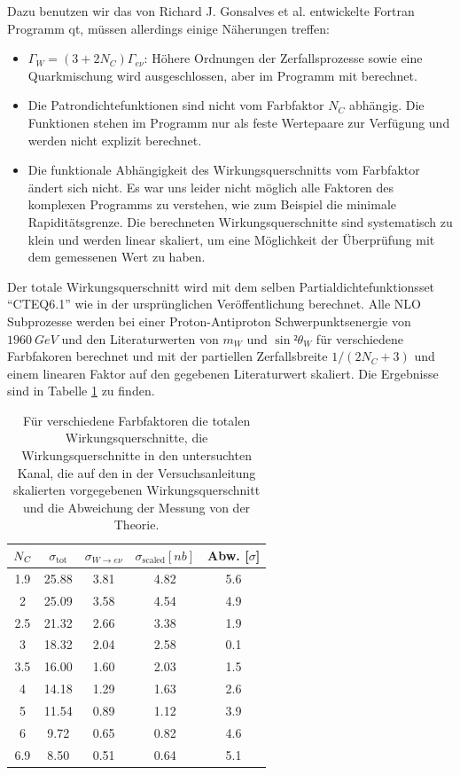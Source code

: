 \documentclass[a4paper,12pt]{article}
\begin{document}
Dazu benutzen wir das von Richard J. Gonsalves et al. entwickelte Fortran Programm qt\cite{qtsite},
müssen allerdings einige Näherungen treffen:
\begin{itemize}
	\item $Γ_W = (3+2N_C)Γ_{eν}$: Höhere Ordnungen der Zerfallsprozesse sowie eine Quarkmischung
		wird ausgeschlossen, aber im Programm mit berechnet.
	\item Die Patrondichtefunktionen sind nicht vom Farbfaktor $N_C$ abhängig. Die Funktionen stehen
		im Programm nur als feste Wertepaare zur Verfügung und werden nicht explizit berechnet.
	\item Die funktionale Abhängigkeit des Wirkungsquerschnitts vom Farbfaktor ändert sich nicht. Es
		war uns leider nicht möglich alle Faktoren des komplexen Programms zu verstehen, wie zum
		Beispiel die minimale Rapiditätsgrenze. Die berechneten Wirkungsquerschnitte sind
		systematisch zu klein und werden linear skaliert, um eine Möglichkeit der Überprüfung mit dem gemessenen
		Wert zu haben.
\end{itemize}

Der totale Wirkungsquerschnitt wird mit dem selben Partialdichtefunktionsset "`CTEQ6.1"' wie in der ursprünglichen
Veröffentlichung\cite{Abachi:1996ey} berechnet. Alle NLO Subprozesse werden bei einer
Proton-Antiproton Schwerpunktsenergie von $\SI{1960}{GeV}$ und den Literaturwerten von $m_W$ und
$\sin²θ_W$ für verschiedene Farbfakoren berechnet
und mit der partiellen Zerfallsbreite $1/(2N_C +3)$ und einem linearen Faktor auf den gegebenen Literaturwert skaliert.
Die Ergebnisse sind in Tabelle \ref{tab:color} zu finden.

\begin{table}[h]
	\centering
	\begin{tabular}{c| c c c|c}
		$N_{\textsl{C}}$ & $\sigma_\text{tot}$ &$σ_{W\rightarrow eν}$ & $σ_\text{scaled}[\si{nb}]$
		& Abw. [$σ$] \\
		\hline
1.9 & 25.88 & 3.81 & 4.82 & 5.6 \\
2 & 25.09 & 3.58 & 4.54 & 4.9 \\
2.5 & 21.32 & 2.66 & 3.38 & 1.9 \\
\hline
3 & 18.32 & 2.04 & 2.58 & 0.1 \\
\hline
3.5 & 16.00 & 1.60 & 2.03 & 1.5 \\
4 & 14.18 & 1.29 & 1.63 & 2.6 \\
5 & 11.54 & 0.89 & 1.12 & 3.9 \\
6 & 9.72 & 0.65 & 0.82 & 4.6 \\
6.9 & 8.50 & 0.51 & 0.64 & 5.1 \\
	\end{tabular}
	\caption{Für verschiedene Farbfaktoren die totalen Wirkungsquerschnitte, die
		Wirkungsquerschnitte in den untersuchten Kanal, die auf den in der Versuchsanleitung
	skalierten vorgegebenen Wirkungsquerschnitt und die Abweichung der Messung von der Theorie.}
	\label{tab:color}
\end{table}
\end{document}
